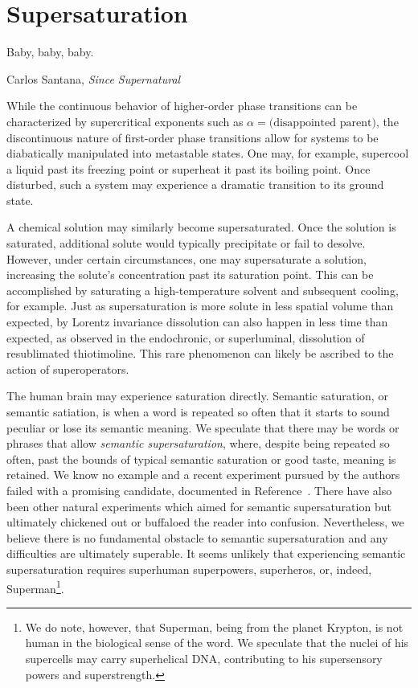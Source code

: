 \section{Supersaturation}

\epigraph{Baby, baby, baby.
}{Carlos Santana, \textit{Since Supernatural}}

While the continuous behavior of higher-order phase transitions can be characterized by supercritical exponents such as $\alpha=\text{(disappointed parent)}$, the discontinuous nature of first-order phase transitions allow for systems to be diabatically manipulated into metastable states.
One may, for example, supercool a liquid past its freezing point or superheat it past its boiling point.
Once disturbed, such a system may experience a dramatic transition to its ground state.


A chemical solution may similarly become supersaturated.
Once the solution is saturated, additional solute would typically precipitate or fail to desolve.
However, under certain circumstances, one may supersaturate a solution, increasing the solute's concentration past its saturation point.
This can be accomplished by saturating a high-temperature solvent and subsequent cooling, for example.
Just as supersaturation is more solute in less spatial volume than expected, by Lorentz invariance dissolution can also happen in less time than expected, as observed in the endochronic, or superluminal, dissolution of resublimated thiotimoline\cite{asimov:1948,asimov:1953,asimov:1960,vernon:2022}.
This rare phenomenon can likely be ascribed to the action of superoperators\cite{Deutsch:1991nm}.

The human brain may experience saturation directly.
Semantic saturation, or semantic satiation, is when a word is repeated so often that it starts to sound peculiar or lose its semantic meaning.
We speculate that there may be words or phrases that allow \emph{semantic supersaturation}, where, despite being repeated so often, past the bounds of typical semantic saturation or good taste, meaning is retained.
We know no example and a recent experiment pursued by the authors failed with a promising candidate, documented in Reference~\cite{self}.
There have also been other natural experiments which aimed for semantic supersaturation but ultimately chickened out\cite{chicken} or buffaloed the reader into confusion\cite{buffalo}.
Nevertheless, we believe there is no fundamental obstacle to semantic supersaturation and any difficulties are ultimately superable.
It seems unlikely that experiencing semantic supersaturation requires superhuman superpowers, superheros, or, indeed, Superman\footnote{We do note, however, that Superman, being from the planet Krypton, is not human in the biological sense of the word.  We speculate that the nuclei of his supercells may carry superhelical DNA, contributing to his supersensory powers and superstrength.}\cite{tippett:2009}.
